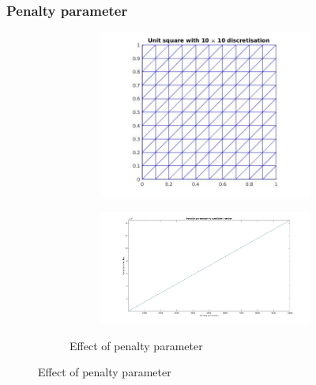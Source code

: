 \documentclass{beamer}
\begin{document}
\begin{frame}
\frametitle{Penalty parameter}
\begin{figure}
\begin{figure}
\begin{subfigure}{0.25\textwidth}	
  \includegraphics[width=\linewidth]{grid_penalty_parameter.jpg}
  \label{grid_penalty_para}
\end{subfigure}
\begin{subfigure}{0.7\textwidth}	
	\includegraphics[width=0.8\linewidth]{penalty_condition_number.jpg}
	\label{penalty_condition_number}
\end{subfigure}
\caption{Effect of penalty parameter}
\label{effect_penalty_parameter}
\end{figure}
\end{figure}
\end{frame}
\end{document}

